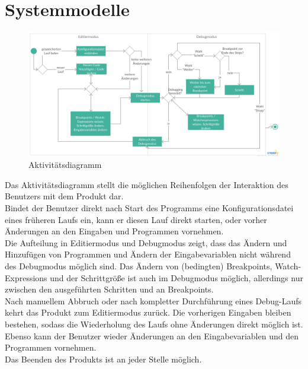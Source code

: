 \documentclass[parskip=full]{scrartcl}
\begin{document}
\newpage
\section{Systemmodelle}
\begin{figure}[h] 
  \centering
     \includegraphics[width=1.0\textwidth]{Aktivitaetsdiagramm}
  \caption{Aktivitätsdiagramm}
  \label{fig:Bild2}
\end{figure}
\vspace{0.7cm}
Das Aktivitätsdiagramm stellt die möglichen Reihenfolgen der Interaktion des Benutzers mit dem Produkt dar. \\
Bindet der Benutzer direkt nach Start des Programms eine \gls{Konfigurationsdatei} eines früheren Laufs ein, kann er diesen Lauf direkt starten, oder vorher Änderungen an den Eingaben und Programmen vornehmen. \\
Die Aufteilung in \gls{Editiermodus} und \gls{Debugmodus} zeigt, dass das Ändern und Hinzufügen von Programmen und Ändern der Eingabevariablen nicht während des \gls{Debugmodus} möglich sind. Das Ändern von (bedingten) \glspl{Breakpoint}, \glspl{Watch-Expression} und der Schrittgröße ist auch im Debugmodus möglich, allerdings nur zwischen den ausgeführten Schritten und an \glspl{Breakpoint}. \\
Nach manuellem Abbruch oder nach kompletter Durchführung eines Debug-Laufs kehrt das Produkt zum \gls{Editiermodus} zurück. Die vorherigen Eingaben bleiben bestehen, sodass die Wiederholung des Laufs ohne Änderungen direkt möglich ist. Ebenso kann der Benutzer wieder Änderungen an den Eingabevariablen und den Programmen vornehmen.\\
Das Beenden des Produkts ist an jeder Stelle möglich.

\newpage
\end{document}

